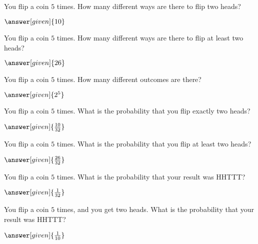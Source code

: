 \documentclass[nooutcomes]{ximera}
\begin{document}
\begin{problem}
	You flip a coin $5$ times.  How many different ways are there to flip two heads?
	\begin{prompt}
		$\answer[given]{10}$
	\end{prompt}
\end{problem}

\begin{problem}
	You flip a coin $5$ times.  How many different ways are there to flip at least two heads?
	\begin{prompt}
		$\answer[given]{26}$
	\end{prompt}
\end{problem}


\begin{problem}
	You flip a coin $5$ times.  How many different outcomes are there?
	\begin{prompt}
		$\answer[given]{2^5}$
	\end{prompt}
\end{problem}


\begin{problem}
	You flip a coin $5$ times.  What is the probability that you flip exactly two heads?
	\begin{prompt}
		$\answer[given]{\frac{10}{32}}$
	\end{prompt}
\end{problem}


\begin{problem}
	You flip a coin $5$ times.  What is the probability that you flip at least two heads?
	\begin{prompt}
		$\answer[given]{\frac{26}{32}}$
	\end{prompt}
\end{problem}


\begin{problem}
	You flip a coin $5$ times.  What is the probability that your result was HHTTT?
	\begin{prompt}
		$\answer[given]{\frac{1}{32}}$
	\end{prompt}
\end{problem}


\begin{problem}
	You flip a coin $5$ times, and you get two heads.  What is the probability that your result was HHTTT?
	\begin{prompt}
		$\answer[given]{\frac{1}{10}}$
	\end{prompt}
\end{problem}
\end{document}
